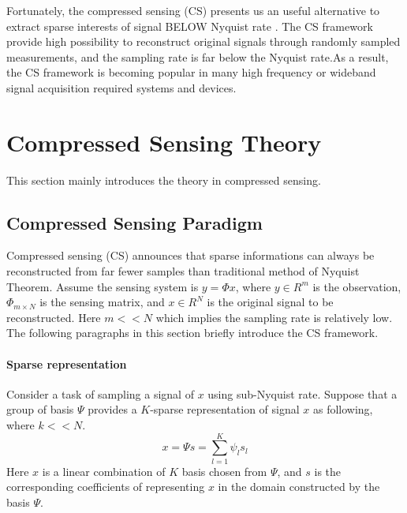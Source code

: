 Fortunately, the compressed sensing (CS) presents us an useful alternative to extract sparse interests of signal BELOW Nyquist rate \cite{lustig2008compressed}. The CS framework provide high possibility to reconstruct original signals through randomly sampled measurements, and the sampling rate is far below the Nyquist rate.As a result, the CS framework is becoming popular in many high frequency or wideband signal acquisition required systems and devices. 

\section{Compressed Sensing Theory}\label{sct:cs_theory}
\indent \indent This section mainly introduces the theory in compressed sensing. 

\subsection{Compressed Sensing Paradigm}\label{sct:cs_paradigm}
\indent \indent Compressed sensing (CS) announces that sparse informations can always be reconstructed from far fewer samples than traditional method of Nyquist Theorem. Assume the sensing system is $y = \Phi x$, where $y \in R^m$ is the observation, $\Phi_{m \times N}$ is the sensing matrix, and $x \in R^N$ is the original signal to be reconstructed. Here $m << N$ which implies the sampling rate is relatively low. The following paragraphs in this section briefly introduce the CS framework.

\paragraph{Sparse representation}
Consider a task of sampling a signal of $x$ using sub-Nyquist rate. Suppose that a group of basis $\Psi$ provides a $K$-sparse representation of signal $x$ as following, where $k << N$.
\begin{equation}
\label{eq_sparse}
x=\Psi s=\sum_{l=1}^{K}\psi_l s_l  
\end{equation}
Here $x$ is a linear combination of $K$ basis chosen from $\Psi$, and $s$ is the corresponding coefficients of representing $x$ in the domain constructed by the basis $\Psi$. 

